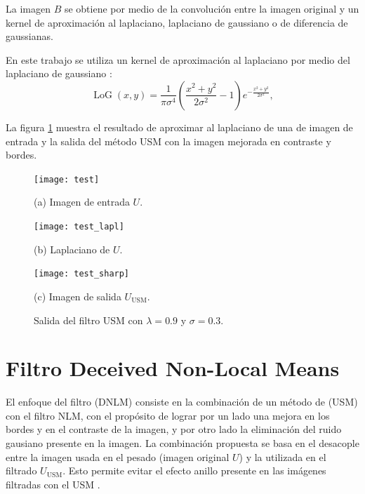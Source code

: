 La imagen $B$ se obtiene por medio de la convolución entre la imagen original y un kernel de aproximación al laplaciano, laplaciano de gaussiano o de diferencia de gaussianas.


En este trabajo se utiliza un kernel de aproximación al laplaciano por medio del laplaciano de gaussiano \cite{sotak1989laplacian}:
%
\begin{equation}
\label{eq:log}
\operatorname{LoG}(x,y) = \frac{1}{\pi\sigma^4}\left(\frac{x^2+y^2}{2\sigma^2} - 1\right)e^{-\frac{x^2+y^2}{2\sigma^2}},
\end{equation}

La figura \ref{fig:exampleUSM} muestra el resultado de aproximar al laplaciano de una de imagen de entrada y la salida del método USM con la imagen mejorada en contraste y bordes. 

\begin{figure}[htb]
%
\begin{minipage}{0.25\textwidth}
  \centering
  \centerline{\texttt{[image: test]}}
  \centerline{(a) Imagen de entrada $U$.}\medskip
\end{minipage}
\hfill
\begin{minipage}{0.25\textwidth}
  \centering
  \centerline{\texttt{[image: test\_lapl]}}
  \centerline{(b) Laplaciano de $U$.}
\end{minipage}
\hfill
\begin{minipage}{0.25\textwidth}
  \centering
  \centerline{\texttt{[image: test\_sharp]}}
  \centerline{(c) Imagen de salida $U_{\textrm{USM}}$.}\medskip
\end{minipage}
%
\caption[Ejemplo de mejora en imagen con ]{Salida del filtro USM con $\lambda = 0.9$ y $\sigma = 0.3$. \label{fig:exampleUSM}}
%
\end{figure}


\section{Filtro Deceived Non-Local Means}
\label{ch:marco_dnlm}


El enfoque del filtro  (DNLM) consiste en la combinación de un método de  (USM) con el filtro NLM, con el propósito de lograr por un lado una mejora en los bordes y en el contraste de la imagen, y por otro lado la eliminación del ruido gausiano  presente en la imagen. La combinación propuesta se basa en el desacople entre la imagen usada en el pesado (imagen original $U$) y la utilizada en el filtrado $U_{\textrm{USM}}$. Esto permite evitar el efecto anillo presente en las im\'agenes filtradas con el USM \cite{calderon2015dewaff}.

